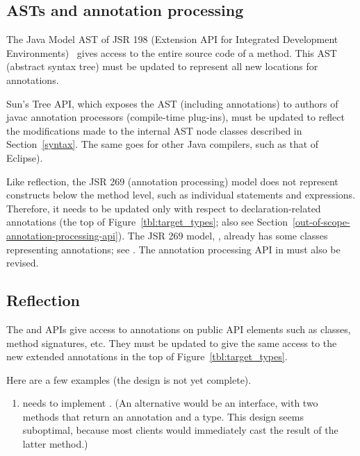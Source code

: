 \documentclass[10pt]{article}
\begin{document}
\subsection{ASTs and annotation processing\label{asts-and-annotation-processing}}

The Java Model AST of JSR 198 (Extension API for Integrated Development
Environments)~\cite{JSR198} gives access to the entire source code of a
method.  This AST (abstract syntax tree) must be updated to represent all
new locations for annotations.

Sun's Tree API, which exposes the AST (including annotations) to authors of
javac annotation processors (compile-time plug-ins), must be updated to
reflect the modifications made to the internal AST node classes described in
Section~\ref{syntax}.
The same goes for other Java compilers, such as that of Eclipse).


\label{jsr269-changes}

Like reflection, the JSR 269 (annotation processing) model
does not represent constructs below the
method level, such as individual statements and expressions.  Therefore, it
needs to be updated only with respect to declaration-related annotations
(the top of Figure~\ref{tbl:target_types}; also see Section~\ref{out-of-scope-annotation-processing-api}).
The JSR 269 model, ,
already has some classes representing annotations; see
.
The annotation processing API in  must
also be revised.




\subsection{Reflection\label{reflection}}

The  and  APIs give access
to annotations on public API elements such as classes,
method signatures, etc.  They must be updated to give the same
access to the new extended annotations in the top of
Figure~\ref{tbl:target_types}.

Here are a few examples (the design is not yet complete).

\begin{enumerate}
\item
{} needs to implement
.
(An alternative would be an 
interface, with two methods that return an annotation and a type.  This
design seems suboptimal, because most
clients would immediately cast the result of the latter method.)

\end{enumerate}
\end{document}
